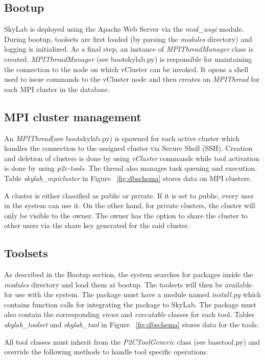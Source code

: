 \subsection{Bootup}
SkyLab is deployed using the Apache Web Server via the \textit{mod\_wsgi} module. During bootup, toolsets are first loaded (by parsing the \textit{modules} directory) and logging is initialized. As a final step, an instance of \textit{MPIThreadManager} class is created. \textit{MPIThreadManager} (see bootskylab.py) is responsible for maintaining the connection to the node on which vCluster can be invoked. It opens a shell used to issue commands to the vCluster node and then creates an \textit{MPIThread} for each MPI cluster in the database. 

\subsection{MPI cluster management} 
An \textit{MPIThread}(see bootskylab.py) is spawned for each active cluster which handles the connection to the assigned cluster via Secure Shell (SSH). Creation and deletion of clusters is done by using \textit{vCluster} commands while tool activation is done by using \textit{p2c-tools}. The thread also manages task queuing and execution. Table \textit{skylab\_mpicluster} in Figure ~\ref{fig:dbschema} stores data on MPI clusters.
		
A cluster is either classified as public or private. If it is set to public, every user in the system can use it. On the other hand, for private clusters, the cluster will only be visible to the owner. The owner has the option to share the cluster to other users via the share key generated for the said cluster. 		

\subsection{Toolsets} 
As described in the Bootup section, the system searches for packages inside the \textit{modules} directory and load them at bootup. The toolsets will then be available for use with the system. The package must have a module named \textit{install.py} which contains function calls for integrating the package to  SkyLab. The package must also contain the corresponding \textit{views} and \textit{executable} classes for each tool. Tables \textit{skylab\_toolset} and  \textit{skylab\_tool} in Figure ~\ref{fig:dbschema} stores data for the tools.

All tool classes must inherit from the \textit{P2CToolGeneric} class (see basetool.py) and override the following methods to handle tool specific operations. 

